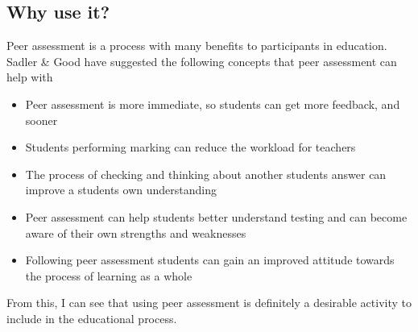 \documentclass[a4paper,11pt]{report}
\begin{document}
\subsection{Why use it?}
Peer assessment is a process with many benefits to participants in education. Sadler \& Good \cite{sadler_impact_2006} have suggested the following concepts that peer assessment can help with
\begin{itemize}
 \item Peer assessment is more immediate, so students can get more feedback, and sooner
 \item Students performing marking can reduce the workload for teachers
 \item The process of checking and thinking about another students answer can improve a students own understanding
 \item Peer assessment can help students better understand testing and can become aware of their own strengths and weaknesses
 \item Following peer assessment students can gain an improved attitude towards the process of learning as a whole
\end{itemize}
From this, I can see that using peer assessment is definitely a desirable activity to include in the educational process.\par
\end{document}
